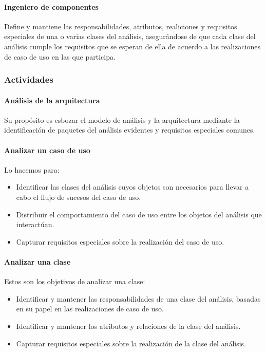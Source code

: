\paragraph{Ingeniero de componentes}
Define y mantiene las responsabilidades, atributos, realiciones y requisitos especiales de una o varias clases del análisis, asegurándose de que cada clase del análisis cumple los requisitos que se esperan de ella de acuerdo a las realizaciones de caso de uso en las que participa.
\subsubsection{Actividades}
\paragraph{Análisis de la arquitectura}
Su propósito es esbozar el modelo de análisis y la arquitectura mediante la identificación de paquetes del análisis evidentes y requisitos especiales comunes.
\paragraph{Analizar un caso de uso}
Lo hacemos para:
\begin{itemize}
\item Identificar las clases del análisis cuyos objetos son necesarios para llevar a cabo el flujo de sucesos del caso de uso.
\item Distribuir el comportamiento del caso de uso entre los objetos del análisis que interactúan.
\item Capturar requisitos especiales sobre la realización del caso de uso.
\end{itemize}
\paragraph{Analizar una clase}
Estos son los objetivos de analizar una clase:
\begin{itemize}
\item Identificar y mantener las responsabilidades de una clase del análisis, basadas en su papel en las realizaciones de caso de uso.
\item Identificar y mantener los atributos y relaciones de la clase del análisis.
\item Capturar requisitos especiales sobre la realización de la clase del análisis.
\end{itemize}
